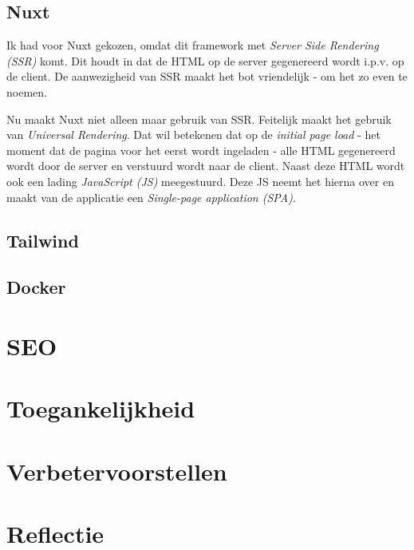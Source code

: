 \documentclass[a4paper]{report}
\begin{document}
    \section{Nuxt}
    Ik had voor Nuxt gekozen, omdat dit framework met \textit{Server Side Rendering (SSR)} komt.
    Dit houdt in dat de HTML op de server gegenereerd wordt i.p.v. op de client. De aanwezigheid van SSR maakt het bot vriendelijk - om het zo even te noemen.

    Nu maakt Nuxt niet alleen maar gebruik van SSR. Feitelijk maakt het gebruik van \textit{Universal Rendering}.
    Dat wil betekenen dat op de \textit{initial page load} - het moment dat de pagina voor het eerst wordt ingeladen - alle HTML gegenereerd wordt door de server
    en verstuurd wordt naar de client. Naast deze HTML wordt ook een lading \textit{JavaScript (JS)} meegestuurd. Deze JS neemt het hierna over en maakt van de applicatie een
    \textit{Single-page application (SPA)}.

    \section{Tailwind}

    \section{Docker}

    \chapter{SEO}

    \chapter{Toegankelijkheid}

    \chapter{Verbetervoorstellen}

    \chapter{Reflectie}

    \printbibliography
\end{document}
